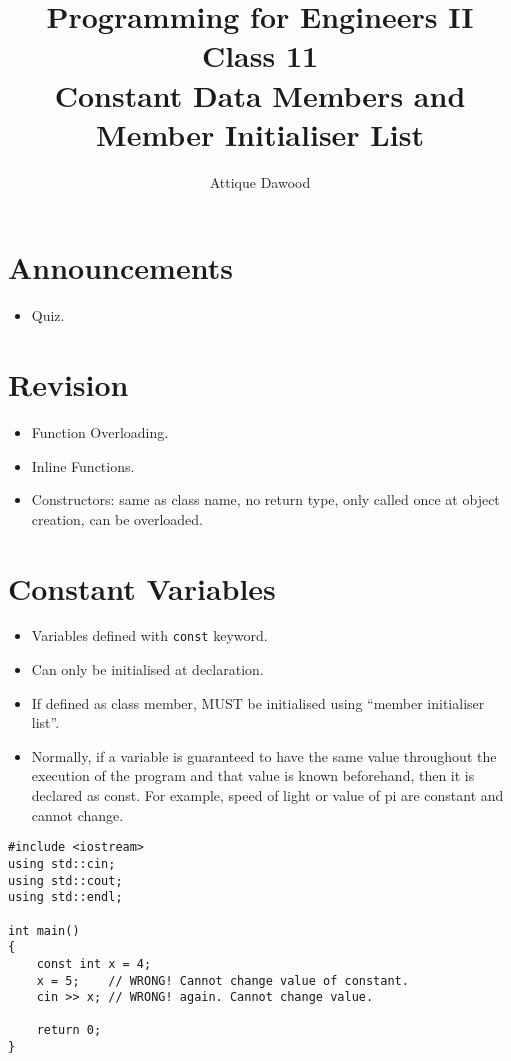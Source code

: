 \documentclass[12pt,a4paper]{article}
\title{\vspace{-2cm}Programming for Engineers II\\Class 11\\Constant Data Members and Member Initialiser List}
\author{Attique Dawood}
\begin{document}
\maketitle
\section{Announcements}
\begin{itemize}
\item Quiz.
\end{itemize}
\section{Revision}
\begin{itemize}
\item Function Overloading.
\item Inline Functions.
\item Constructors: same as class name, no return type, only called once at object creation, can be overloaded.
\end{itemize}
\section{Constant Variables}
\begin{itemize}
\item Variables defined with \verb|const| keyword.
\item Can only be initialised at declaration.
\item If defined as class member, MUST be initialised using ``member initialiser list''.
\item Normally, if a variable is guaranteed to have the same value throughout the execution of the program and that value is known beforehand, then it is declared as const. For example, speed of light or value of pi are constant and cannot change.
\end{itemize}
\begin{lstlisting}[caption={const variable}]
#include <iostream>
using std::cin;
using std::cout;
using std::endl;

int main()
{
	const int x = 4;
	x = 5;    // WRONG! Cannot change value of constant.
	cin >> x; // WRONG! again. Cannot change value.
	
	return 0;
}
\end{lstlisting}
\end{document}
